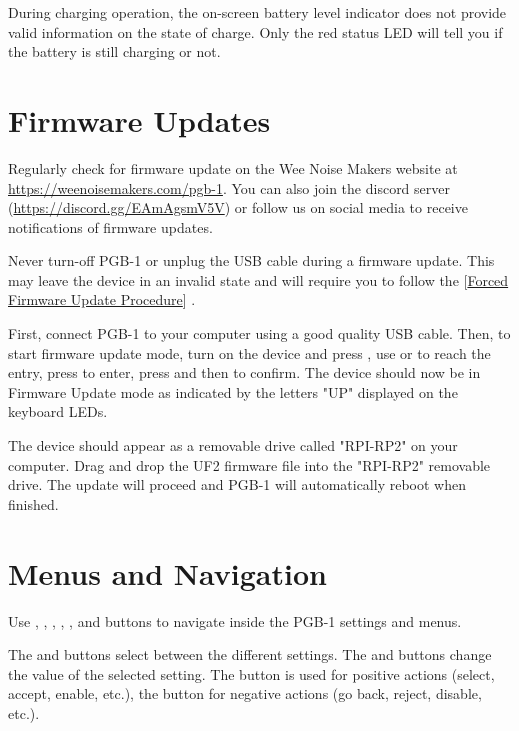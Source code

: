 \documentclass[8pt]{extarticle}
\def\device{PGB-1 }
\def\WNM{Wee Noise Makers }
\def\firmwareupdatesurl{https://weenoisemakers.com/pgb-1}
\def\discordurl{https://discord.gg/EAmAgsmV5V}
\newcommand{\reflabel}[2]{
[\hyperref[#1]{#2}]
}
\begin{document}
\begin{multicols*}{3}
\begin{important}
    During charging operation, the on-screen battery level indicator does not provide valid information on the state of charge. Only the red status LED will tell you if the battery is still charging or not.
\end{important}

\section{Firmware Updates}
\label{procedure:firmware_update}

Regularly check for firmware update on the \WNM website at
\url{\firmwareupdatesurl}. You can also join the discord server (\url{\discordurl}) or follow us on social media to receive notifications of firmware updates.

\begin{important}
    Never turn-off \device or unplug the USB cable during a firmware update. This may leave the device in an invalid state and will require you to follow the \reflabel{procedures:forced_firmware_update}{Forced Firmware Update Procedure}.
\end{important}

First, connect \device to your computer using a good quality USB cable. Then, to start firmware update mode, turn on the device and press , use  or  to reach the  entry, press  to enter, press  and then  to confirm. The device should now be in Firmware Update mode as indicated by the letters "UP" displayed on the keyboard LEDs.

The device should appear as a removable drive called "RPI-RP2" on your computer. Drag and drop the UF2 firmware file into the "RPI-RP2" removable drive. The update will proceed and \device will automatically reboot when finished.

\section{Menus and Navigation}

Use , , , , , and  buttons to navigate inside the \device settings and menus.

The  and  buttons select between the different settings.
The  and  buttons change the value of the selected setting.
The  button is used for positive actions (select, accept, enable, etc.),
the  button for negative actions (go back, reject, disable, etc.).


\end{multicols*}
\end{document}
